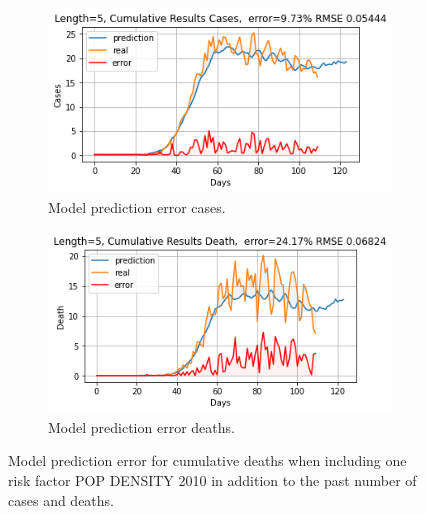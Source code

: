 \documentclass[letterpaper, inpress]{jds} %
\renewcommand{\_}{%
    \textunderscore\hspace{0pt}%
}
\begin{document}
\begin{figure}[!h]
  \begin{subfigure}{.49\textwidth}
    \centering
    \includegraphics[width=1.0\textwidth]{images/predict/Length_5-fields_pop_density_2010-Cumulative-Cases.png}
    \caption{Model prediction error cases.}
    \label{fig:error-case-popdensity}
  \end{subfigure}
  \begin{subfigure}{.49\textwidth}
    \centering
    \includegraphics[width=1.0\textwidth]{images/predict/Length_5-fields_pop_density_2010-Cumulative-Death.png}
    \caption{Model prediction error deaths.}
    \label{fig:error-death-popdensity}
    \end{subfigure}

    \caption{Model prediction error for cumulative deaths when
      including one risk factor POP\_DENSITY\_2010
      in addition to the past number of cases and deaths.}
    \label{fig:error-death-popdensity}
  
    
\end{figure}
\end{document}

